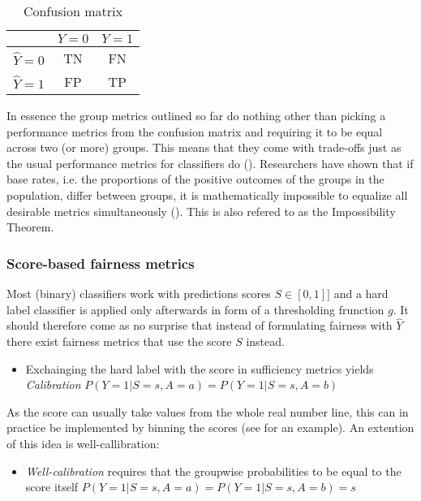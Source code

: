 \begin{table}
    \centering
    \begin{tabular}{|c|c|c|}
        \hline
        & \(Y = 0\) & \(Y = 1\) \\
        \hline
        \(\hat{Y} = 0\) & TN & FN \\
        \hline
        \(\hat{Y} = 1\) & FP & TP \\
        \hline
    \end{tabular}
    \caption{Confusion matrix}
    \label{tab:confusionMatrix}
\end{table}

In essence the group metrics outlined so far do nothing other than picking a performance metrics from the confusion matrix and requiring it to be equal across two (or more) groups.
This means that they come with trade-offs just as the usual performance metrics for classifiers do (\cite{kleinberg2017}). Researchers have shown that if base rates, i.e. the proportions of the positive outcomes of the groups in the population, differ between groups, it is mathematically impossible to equalize all desirable metrics simultaneously (\cite{Chouldechova2016FairPW}). This is also refered to as the Impossibility Theorem.

\subsubsection*{Score-based fairness metrics}
Most (binary) classifiers work with predictions scores $S \in [0,1]]$ and a hard label classifier is applied only afterwards in form of a thresholding frunction $g$. It should therefore come as no surprise that instead of formulating fairness with $\hat{Y}$ there exist fairness metrics that use the score $S$ instead.
\begin{itemize}
    \item Exchainging the hard label with the score in sufficiency metrics yields \textit{Calibration} $P(Y = 1 | S = s, A = a) = P(Y = 1 | S = s, A = b)$
\end{itemize}
As the score can usually take values from the whole real number line, this can in practice be implemented by binning the scores (see \cite{verma2018} for an example). An extention of this idea is well-callibration:
\begin{itemize}
    \item \textit{Well-calibration} requires that the groupwise probabilities to be equal to the score itself $P(Y = 1 | S = s, A = a) = P(Y = 1 | S = s, A = b) = s$
\end{itemize}

